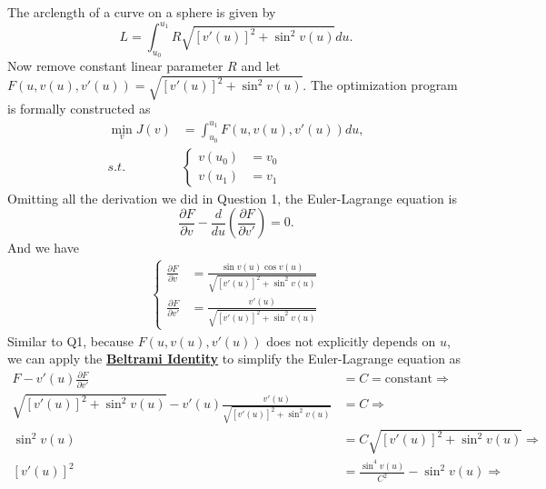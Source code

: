 \documentclass[conference,onecolumn]{IEEEtran}
\begin{document}
\begin{enumerate}
            The arclength of a curve on a sphere is given by
            $$
                  L = \int_{u_0}^{u_1} R \sqrt{[v'(u)]^2 + \sin^2v(u)} du.
            $$
            Now remove constant linear parameter $R$ and let $F(u, v(u), v'(u)) = \sqrt{[v'(u)]^2 + \sin^2v(u)}$. The optimization program is formally constructed as
            \begin{align*}
                  \min_v J(v) & = \int_{u_0}^{u_1} F(u, v(u), v'(u)) du, \\
                  s.t.        & \begin{cases}
                        v(u_0) & = v_0 \\
                        v(u_1) & = v_1
                  \end{cases}
            \end{align*}
            Omitting all the derivation we did in Question 1, the Euler-Lagrange equation is
            $$
                  \frac{\partial F}{\partial v} - \frac{d}{du} \left( \frac{\partial F}{\partial v'} \right) = 0.
            $$
            And we have
            \begin{align*}
                  \begin{cases}
                        \frac{\partial F}{\partial v}  & = \frac{\sin v(u) \cos v(u)}{\sqrt{[v'(u)]^2 + \sin^2 v(u)}} \\
                        \frac{\partial F}{\partial v'} & = \frac{v'(u)}{\sqrt{[v'(u)]^2 + \sin^2 v(u)}}
                  \end{cases}
            \end{align*}
            Similar to Q1, because $F(u, v(u), v'(u))$ does not explicitly depends on $u$, we can apply the \textbf{\href{https://en.wikipedia.org/wiki/Beltrami_identity}{Beltrami Identity}} to simplify the Euler-Lagrange equation as
            \begin{align*}
                  F - v'(u) \frac{\partial F}{\partial v'}                                           & = C = \text{constant} \Rightarrow                   \\
                  \sqrt{[v'(u)]^2 + \sin^2v(u)} - v'(u) \frac{v'(u)}{\sqrt{[v'(u)]^2 + \sin^2 v(u)}} & = C \Rightarrow                                     \\
                  \sin^2 v(u)                                                                        & = C \sqrt{[v'(u)]^2 + \sin^2 v(u)} \Rightarrow      \\
                  [v'(u)]^2                                                                          & = \frac{\sin^4 v(u)}{C^2} - \sin^2 v(u) \Rightarrow \\

\end{align*}
\end{enumerate}
\end{document}
